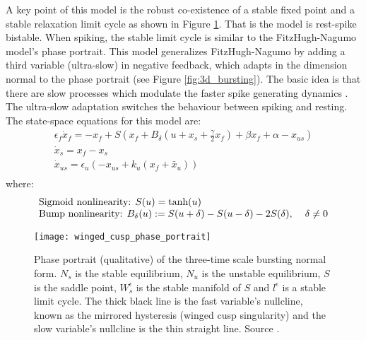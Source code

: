 \documentclass[a4paper, 12pt]{article}
\begin{document}
A key point of this model is the robust co-existence of a stable fixed point and a stable relaxation limit cycle as shown in Figure \ref{fig:bursting_fundamental_phase_portait}. That is the model is rest-spike bistable. When spiking, the stable limit cycle is similar to the FitzHugh-Nagumo model's phase portrait. This model generalizes FitzHugh-Nagumo by adding a third variable (ultra-slow) in negative feedback, which adapts in the dimension normal to the phase portrait (see Figure \ref{fig:3d_bursting}). The basic idea is that there are slow processes which modulate the faster spike generating dynamics \cite{rinzel}. The ultra-slow adaptation switches the behaviour between spiking and resting. The state-space equations for this model are:
\begin{equation}
\begin{array}{l}
\displaystyle \epsilon_f\dot{x}_{f} = -x_f + S\left(x_f + B_\delta\left(u + x_s + \tfrac{\gamma}{2}x_f\right) + \beta x_f + \alpha  - x_{us}  \right)\\
\displaystyle \dot{x}_{s} = x_f - x_s \\
\displaystyle \dot{x}_{us} = \epsilon_u\left(-x_{us} + k_u(x_f+\bar{x}_u) \right)\\
\end{array}
\label{eq:restSpikeBistability}
\end{equation}
where:
\begin{equation}
\begin{array}{l}
\displaystyle \text{Sigmoid nonlinearity: }S(u) = \text{tanh}(u) \\
\displaystyle \text{Bump nonlinearity: }B_\delta(u) := S(u+\delta) - S(u-\delta) -2S(\delta),\hspace{0.4cm} \delta\neq0
\end{array}
\end{equation}


\begin{figure}[h!]
\texttt{[image: winged\_cusp\_phase\_portrait]}
\caption{Phase portrait (qualitative) of the three-time scale bursting normal form. $N_s$ is the stable equilibrium, $N_u$ is the unstable equilibrium, $S$ is the saddle point, $W_s^\epsilon$ is the stable manifold of $S$ and $l^\epsilon$ is a stable limit cycle. The thick black line is the fast variable's nullcline, known as the mirrored hysteresis (winged cusp singularity) and the slow variable's nullcline is the thin straight line. Source \cite{franci2}.}
\label{fig:bursting_fundamental_phase_portait}
\end{figure}
\end{document}
